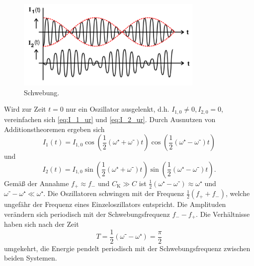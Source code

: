 \begin{figure}[h]
	\centering
	\includegraphics[width=0.8\textwidth]{Bilder/Schwebung.pdf}
		\caption{Schwebung. \cite{v355}}
		\label{fig:schwebung}
\end{figure}

Wird zur Zeit $t=0$ nur ein Oszillator ausgelenkt, d.h. $I_{1,0}\neq0$,\,$I_{2,0}=0$, vereinfachen sich \eqref{eq:I_1_ur} und \eqref{eq:I_2_ur}. 
Durch Ausnutzen von Additionstheoremen ergeben sich
\begin{equation}
	I_1(t)=I_{1,0}\cos(\frac{1}{2}(\omega⁺+\omega⁻)t)\cos(\frac{1}{2}(\omega⁺-\omega⁻)t)
\end{equation}
und
\begin{equation}
	I_2(t)=I_{1,0}\sin(\frac{1}{2}(\omega⁺+\omega⁻)t)\sin(\frac{1}{2}(\omega⁺-\omega⁻)t).
\end{equation}
Gemäß der Annahme $f_+\approx f_-$ und $C_\mathup{K}\gg C$ ist $\frac{1}{2}(\omega⁺-\omega⁻)\approx\omega⁺$ und $\omega⁻-\omega⁺\ll\omega⁺$.
Die Oszillatoren schwingen mit der Frequenz $\frac{1}{2}(f_+ + f_-)$, welche ungefähr der Frequenz eines Einzeloszillators entspricht. 
Die Amplituden verändern sich periodisch mit der Schwebungsfrequenz $f_- - f_+$. 
Die Verhältnisse haben sich nach der Zeit 
\begin{equation}
T=\frac{1}{2}({\omega⁻-\omega⁺})=\frac{\pi}{2}
\end{equation}
 umgekehrt, die Energie pendelt periodisch mit der Schwebungsfrequenz zwischen beiden Systemen.

\newpage
